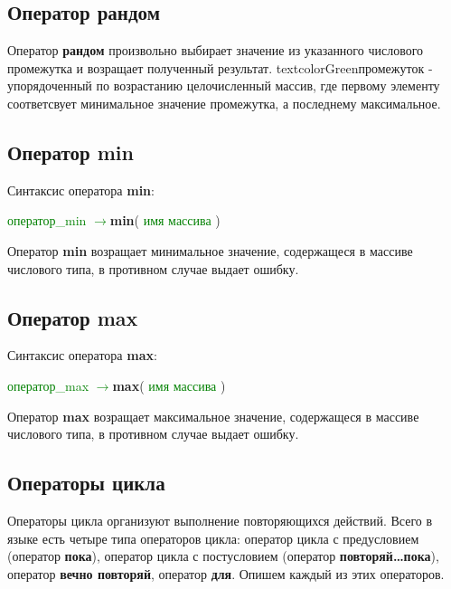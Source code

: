 \documentclass[10pt]{report}
\begin{document}
 \subsection{Оператор рандом}
      \begin{center}
 \end{center}
 Оператор  \textbf{\glqq  рандом\grqq } произвольно выбирает значение из указанного числового промежутка и возращает полученный результат. textcolor{Green}{промежуток} - упорядоченный по возрастанию целочисленный массив, где первому элементу соответсвует минимальное значение промежутка, а последнему максимальное.
 \subsection{Оператор min}
    Синтаксис оператора \textbf{\glqq  min\grqq }:
  \begin{center}
    \textcolor{Green}{оператор_min $\rightarrow$}\textbf{min}( \textcolor{Green}{имя массива} )
 \end{center}
 Оператор \textbf{\glqq  min\grqq } возращает минимальное значение, содержащеся в массиве числового типа, в противном случае выдает ошибку.
 \subsection{Оператор max}
    Синтаксис оператора \textbf{\glqq  max\grqq }:
  \begin{center}
    \textcolor{Green}{оператор_max $\rightarrow$}\textbf{max}( \textcolor{Green}{имя массива} )
 \end{center}
 Оператор \textbf{\glqq max\grqq } возращает максимальное значение, содержащеся в массиве числового типа, в противном случае выдает ошибку.
 
    \subsection{Операторы цикла}
Операторы цикла организуют выполнение повторяющихся действий. Всего в языке есть четыре типа операторов цикла: оператор цикла с предусловием (оператор \textbf{\glqq пока\grqq}),
оператор цикла с постусловием (оператор \textbf{\glqq повторяй\dots пока\grqq}), оператор \textbf{\glqq вечно повторяй\grqq}, оператор \textbf{\glqq для\grqq}. Опишем каждый из этих операторов.
\end{document}
